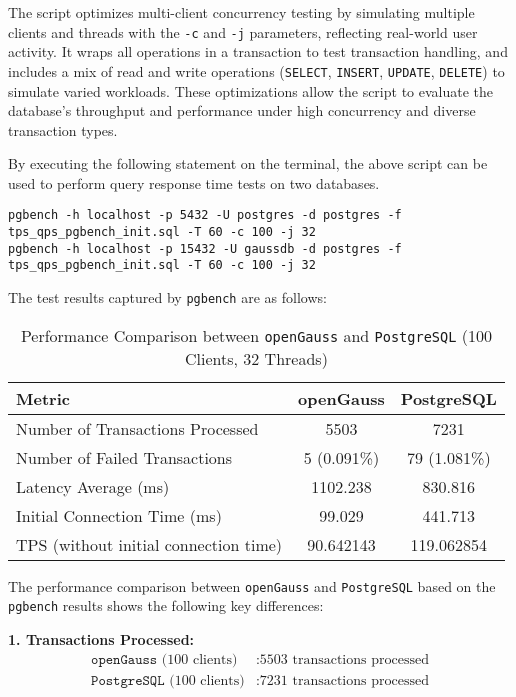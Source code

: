 \documentclass[12pt,a4paper,cs4size]{ctexart}
\begin{document}
The script optimizes multi-client concurrency testing by simulating multiple clients and threads with the \texttt{-c} and \texttt{-j} parameters, reflecting real-world user activity. It wraps all operations in a transaction to test transaction handling, and includes a mix of read and write operations (\texttt{SELECT}, \texttt{INSERT}, \texttt{UPDATE}, \texttt{DELETE}) to simulate varied workloads. These optimizations allow the script to evaluate the database's throughput and performance under high concurrency and diverse transaction types.

By executing the following statement on the terminal, the above script can be used to perform query response time tests on two databases.

\begin{lstlisting}[style=C++]
pgbench -h localhost -p 5432 -U postgres -d postgres -f tps_qps_pgbench_init.sql -T 60 -c 100 -j 32
pgbench -h localhost -p 15432 -U gaussdb -d postgres -f tps_qps_pgbench_init.sql -T 60 -c 100 -j 32
\end{lstlisting}

The test results captured by \texttt{pgbench} are as follows:

\begin{table}[h!]
\centering
\captionsetup{labelformat=empty}
\begin{tabular}{|l|c|c|}
\hline
\textbf{Metric} & \textbf{openGauss} & \textbf{PostgreSQL} \\
\hline
Number of Transactions Processed & 5503 & 7231 \\
\hline
Number of Failed Transactions & 5 (0.091\%) & 79 (1.081\%) \\
\hline
Latency Average (ms) & 1102.238 & 830.816 \\
\hline
Initial Connection Time (ms) & 99.029 & 441.713 \\
\hline
TPS (without initial connection time) & 90.642143 & 119.062854 \\
\hline
\end{tabular}
\caption{Performance Comparison between \texttt{openGauss} and \texttt{PostgreSQL} (100 Clients, 32 Threads)}
\end{table}


The performance comparison between \texttt{openGauss} and \texttt{PostgreSQL} based on the \texttt{pgbench} results shows the following key differences:

\vspace{0.5cm}

\textbf{1. Transactions Processed:}
\[
\begin{aligned}
    \texttt{openGauss}\text{ (100 clients)}&: \text{5503 transactions processed}\\
    \texttt{PostgreSQL}\text{ (100 clients)}&: \text{7231 transactions processed}
\end{aligned}
\]
\end{document}
